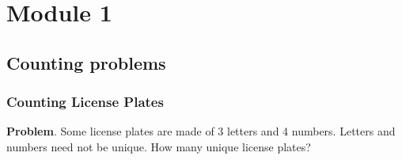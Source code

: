 \chapter{Module 1}

\section{Counting problems}

\subsection{Counting License Plates}

\textbf{Problem}. Some license plates are made of 3 letters and 4 numbers. Letters and numbers need not be unique. How many unique license plates? \\


